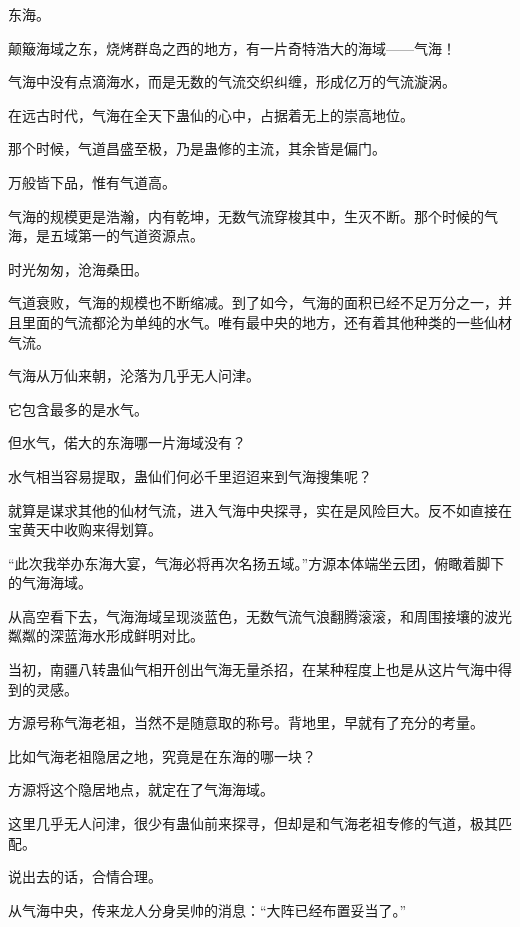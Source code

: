 
\begin{this_body}



东海。

颠簸海域之东，烧烤群岛之西的地方，有一片奇特浩大的海域——气海！

气海中没有点滴海水，而是无数的气流交织纠缠，形成亿万的气流漩涡。

在远古时代，气海在全天下蛊仙的心中，占据着无上的崇高地位。

那个时候，气道昌盛至极，乃是蛊修的主流，其余皆是偏门。

万般皆下品，惟有气道高。

气海的规模更是浩瀚，内有乾坤，无数气流穿梭其中，生灭不断。那个时候的气海，是五域第一的气道资源点。

时光匆匆，沧海桑田。

气道衰败，气海的规模也不断缩减。到了如今，气海的面积已经不足万分之一，并且里面的气流都沦为单纯的水气。唯有最中央的地方，还有着其他种类的一些仙材气流。

气海从万仙来朝，沦落为几乎无人问津。

它包含最多的是水气。

但水气，偌大的东海哪一片海域没有？

水气相当容易提取，蛊仙们何必千里迢迢来到气海搜集呢？

就算是谋求其他的仙材气流，进入气海中央探寻，实在是风险巨大。反不如直接在宝黄天中收购来得划算。

“此次我举办东海大宴，气海必将再次名扬五域。”方源本体端坐云团，俯瞰着脚下的气海海域。

从高空看下去，气海海域呈现淡蓝色，无数气流气浪翻腾滚滚，和周围接壤的波光粼粼的深蓝海水形成鲜明对比。

当初，南疆八转蛊仙气相开创出气海无量杀招，在某种程度上也是从这片气海中得到的灵感。

方源号称气海老祖，当然不是随意取的称号。背地里，早就有了充分的考量。

比如气海老祖隐居之地，究竟是在东海的哪一块？

方源将这个隐居地点，就定在了气海海域。

这里几乎无人问津，很少有蛊仙前来探寻，但却是和气海老祖专修的气道，极其匹配。

说出去的话，合情合理。

从气海中央，传来龙人分身吴帅的消息：“大阵已经布置妥当了。”


\end{this_body}
